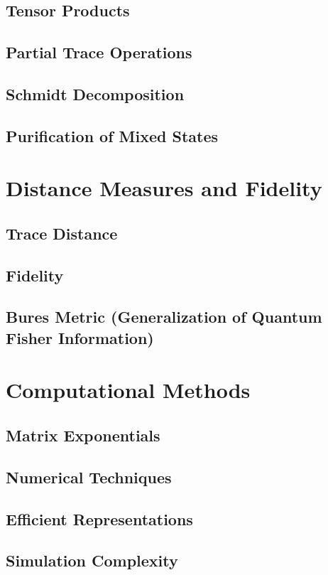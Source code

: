 \documentclass[12pt,a4paper]{book}
\begin{document}
\subsection{Tensor Products}
\subsection{Partial Trace Operations}
\subsection{Schmidt Decomposition}
\subsection{Purification of Mixed States}

\section{Distance Measures and Fidelity}
\subsection{Trace Distance}
\subsection{Fidelity}
\subsection{Bures Metric (Generalization of Quantum Fisher Information)}

\section{Computational Methods}
\subsection{Matrix Exponentials}
\subsection{Numerical Techniques}
\subsection{Efficient Representations}
\subsection{Simulation Complexity}
\end{document}
